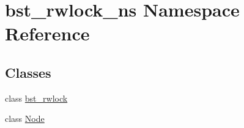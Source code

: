 \hypertarget{namespacebst__rwlock__ns}{}\section{bst\+\_\+rwlock\+\_\+ns Namespace Reference}
\label{namespacebst__rwlock__ns}
\subsection*{Classes}
\begin{DoxyCompactItemize}
\item 
class \hyperlink{classbst__rwlock__ns_1_1bst__rwlock}{bst\+\_\+rwlock}
\item 
class \hyperlink{classbst__rwlock__ns_1_1Node}{Node}
\end{DoxyCompactItemize}

